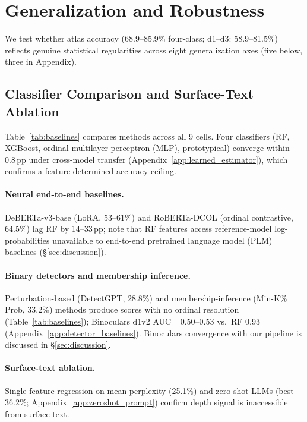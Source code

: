 \section{Generalization and Robustness}
\label{sec:generalization}

We test whether atlas accuracy (68.9--85.9\% four-class; d1--d3: 58.9--81.5\%) reflects genuine statistical regularities across eight generalization axes (five below, three in Appendix).

\subsection{Classifier Comparison and Surface-Text Ablation}
\label{sec:gen:baselines}

Table~\ref{tab:baselines} compares methods across all 9 cells.
Four classifiers (RF, XGBoost, ordinal multilayer perceptron (MLP), prototypical) converge within 0.8\,pp under cross-model transfer (Appendix~\ref{app:learned_estimator}), which confirms a feature-determined accuracy ceiling.

\paragraph{Neural end-to-end baselines.}
DeBERTa-v3-base (LoRA, 53--61\%) and RoBERTa-DCOL (ordinal contrastive, 64.5\%) lag RF by 14--33\,pp; note that RF features access reference-model log-probabilities unavailable to end-to-end pretrained language model (PLM) baselines (\S\ref{sec:discussion}).

\paragraph{Binary detectors and membership inference.}
Perturbation-based (DetectGPT, 28.8\%) and membership-inference (Min-K\% Prob, 33.2\%) methods produce scores with no ordinal resolution (Table~\ref{tab:baselines}); Binoculars d1v2 AUC\,=\,0.50--0.53 vs.\ RF 0.93 (Appendix~\ref{app:detector_baselines}). Binoculars convergence with our pipeline is discussed in \S\ref{sec:discussion}.

\paragraph{Surface-text ablation.}
Single-feature regression on mean perplexity (25.1\%) and zero-shot LLMs (best 36.2\%; Appendix~\ref{app:zeroshot_prompt}) confirm depth signal is inaccessible from surface text.

